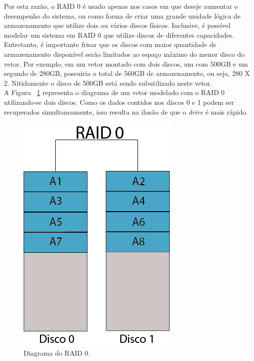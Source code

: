 Por esta razão, o RAID 0 é usado apenas nos casos em que deseje aumentar o desempenho do sistema, ou como forma de criar uma grande unidade lógica de armazenamento que utilize dois ou vários discos físicos. Inclusive, é possível modelar um sistema em RAID 0 que utilize discos de diferentes capacidades. Entretanto, é importante frisar que os discos com maior quantidade de armazenamento disponível serão limitados ao espaço máximo do menor disco do vetor. Por exemplo, em um vetor montado com dois discos, um com 500GB e um segundo de 280GB, possuiria o total de 560GB de armazenamento, ou seja, 280 X 2. Nitidamente o disco de 500GB está sendo subutilizado neste vetor. 
\\

A Figura ~\ref{fig:raid0} representa o diagrama de um vetor modelado com o RAID 0 utilizando-se dois discos. Como os dados contidos nos discos 0 e 1 podem ser recuperados simultaneamente, isso resulta na ilusão de que o \textit{drive} é mais rápido.\\

\begin{figure}[htb]
	\begin{center}
		
		\includegraphics[clip,scale=0.5]{images/RAID_0.png}
		\caption{Diagrama do RAID 0. }
		\label{fig:raid0}
	\end{center}
\end{figure} 

